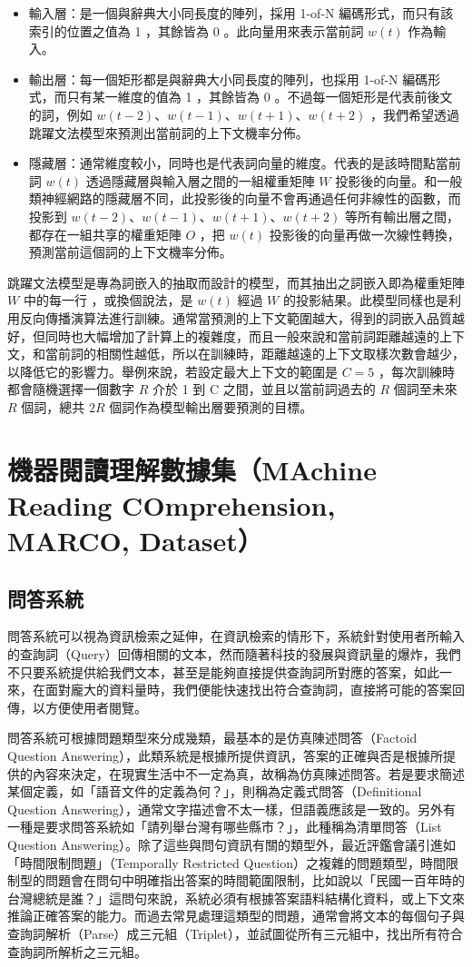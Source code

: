\begin{itemize}
    \item 輸入層：是一個與辭典大小同長度的陣列，採用 1-of-N 編碼形式，而只有該索引的位置之值為 1 ，其餘皆為 0 。此向量用來表示當前詞 $w(t)$ 作為輸入。
    \item 輸出層：每一個矩形都是與辭典大小同長度的陣列，也採用 1-of-N 編碼形式，而只有某一維度的值為 1 ，其餘皆為 0 。不過每一個矩形是代表前後文的詞，例如 $w(t-2)$、$w(t-1)$、$w(t+1)$、$w(t+2)$ ，我們希望透過跳躍文法模型來預測出當前詞的上下文機率分佈。
    \item 隱藏層：通常維度較小，同時也是代表詞向量的維度。代表的是該時間點當前詞 $w(t)$ 透過隱藏層與輸入層之間的一組權重矩陣 $W$ 投影後的向量。和一般類神經網路的隱藏層不同，此投影後的向量不會再通過任何非線性的函數，而投影到 $w(t-2)$、$w(t-1)$、$w(t+1)$、$w(t+2)$ 等所有輸出層之間，都存在一組共享的權重矩陣 $O$ ，把 $w(t)$ 投影後的向量再做一次線性轉換，預測當前這個詞的上下文機率分佈。
\end{itemize}

跳躍文法模型是專為詞嵌入的抽取而設計的模型，而其抽出之詞嵌入即為權重矩陣 $W$ 中的每一行%
，或換個說法，是 $w(t)$ 經過 $W$ 的投影結果。此模型同樣也是利用反向傳播演算法進行訓練。通常當預測的上下文範圍越大，得到的詞嵌入品質越好，但同時也大幅增加了計算上的複雜度，而且一般來說和當前詞距離越遠的上下文，和當前詞的相關性越低，所以在訓練時，距離越遠的上下文取樣次數會越少，以降低它的影響力。舉例來說，若設定最大上下文的範圍是 $C=5$ ，每次訓練時都會隨機選擇一個數字 $R$ 介於 1 到 C 之間，並且以當前詞過去的 $R$ 個詞至未來 $R$ 個詞，總共 $2R$ 個詞作為模型輸出層要預測的目標。

\section{機器閱讀理解數據集（MAchine Reading COmprehension, MARCO, Dataset）}
\subsection{問答系統}
問答系統可以視為資訊檢索之延伸，在資訊檢索的情形下，系統針對使用者所輸入的查詢詞（Query）回傳相關的文本，然而隨著科技的發展與資訊量的爆炸，我們不只要系統提供給我們文本，甚至是能夠直接提供查詢詞所對應的答案，如此一來，在面對龐大的資料量時，我們便能快速找出符合查詢詞，直接將可能的答案回傳，以方便使用者閱覽。

問答系統可根據問題類型來分成幾類，最基本的是仿真陳述問答（Factoid Question Answering），此類系統是根據所提供資訊，答案的正確與否是根據所提供的內容來決定，在現實生活中不一定為真，故稱為仿真陳述問答。若是要求簡述某個定義，如「語音文件的定義為何？」，則稱為定義式問答（Definitional Question Answering），通常文字描述會不太一樣，但語義應該是一致的。另外有一種是要求問答系統如「請列舉台灣有哪些縣市？」，此種稱為清單問答（List Question Answering）。除了這些與問句資訊有關的類型外，最近評鑑會議引進如「時間限制問題」（Temporally Restricted Question）之複雜的問題類型，時間限制型的問題會在問句中明確指出答案的時間範圍限制，比如說以「民國一百年時的台灣總統是誰？」這問句來說，系統必須有根據答案語料結構化資料，或上下文來推論正確答案的能力。而過去常見處理這類型的問題，通常會將文本的每個句子與查詢詞解析（Parse）成三元組（Triplet），並試圖從所有三元組中，找出所有符合查詢詞所解析之三元組。

